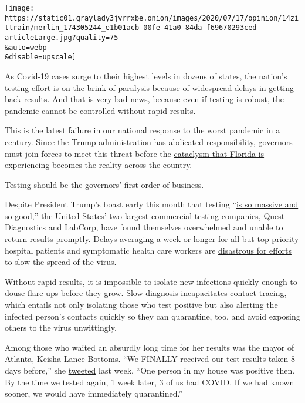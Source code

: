 \texttt{[image: https://static01.graylady3jvrrxbe.onion/images/2020/07/17/opinion/14zittrain/merlin\_174305244\_e1b01acb-00fe-41a0-84da-f69670293ced-articleLarge.jpg?quality=75\\\&auto=webp\\\&disable=upscale]}

As Covid-19 cases
\href{https://coronavirus.jhu.edu/data/new-cases-50-states}{surge} to
their highest levels in dozens of states, the nation's testing effort is
on the brink of paralysis because of widespread delays in getting back
results. And that is very bad news, because even if testing is robust,
the pandemic cannot be controlled without rapid results.

This is the latest failure in our national response to the worst
pandemic in a century. Since the Trump administration has abdicated
responsibility,
\href{https://www.nytimes3xbfgragh.onion/2020/07/13/us/coronavirus-governors.html}{governors}
must join forces to meet this threat before the
\href{https://perma.cc/UW3Q-9M2X}{cataclysm that Florida is
experiencing} becomes the reality across the country.

Testing should be the governors' first order of business.

Despite President Trump's boast early this month that testing
``\href{https://twitter.com/realDonaldTrump/status/1278897430378041344}{is
so massive and so good},'' the United States' two largest commercial
testing companies,
\href{https://newsroom.questdiagnostics.com/COVIDTestingUpdates}{Quest
Diagnostics} and
\href{https://www.labcorp.com/coronavirus-disease-covid-19/labcorp-newsroom}{LabCorp},
have found themselves
\href{https://www.cnbc.com/2020/07/13/us-coronavirus-surge-leads-to-testing-delays-across-the-nation-quest-diagnostics-says.html}{overwhelmed}
and unable to return results promptly. Delays averaging a week or longer
for all but top-priority hospital patients and symptomatic health care
workers are
\href{https://science.sciencemag.org/content/368/6491/eabb6936}{disastrous
for efforts to slow the spread} of the virus.

Without rapid results, it is impossible to isolate new infections
quickly enough to douse flare-ups before they grow. Slow diagnosis
incapacitates contact tracing, which entails not only isolating those
who test positive but also alerting the infected person's contacts
quickly so they can quarantine, too, and avoid exposing others to the
virus unwittingly.

Among those who waited an absurdly long time for her results was the
mayor of Atlanta, Keisha Lance Bottoms. ``We FINALLY received our test
results taken 8 days before,'' she
\href{https://twitter.com/KeishaBottoms/status/1280824621214896129?s=20}{tweeted}
last week. ``One person in my house was positive then. By the time we
tested again, 1 week later, 3 of us had COVID. If we had known sooner,
we would have immediately quarantined.''

